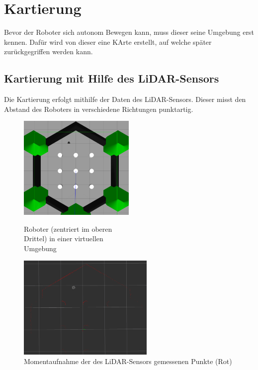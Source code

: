 \section{Kartierung}
{
	Bevor der Roboter sich autonom Bewegen kann, muss dieser seine Umgebung erst kennen. Dafür wird von dieser eine KArte erstellt, auf welche später zurückgegriffen werden kann.
	\subsection{Kartierung mit Hilfe des LiDAR-Sensors}
	{
		Die Kartierung erfolgt mithilfe der Daten des LiDAR-Sensors. Dieser misst den Abstand des Roboters in verschiedene Richtungen punktartig. \newline  
		\begin{figure}[H]
			\begin{minipage}{0.5\textwidth}
				\centering
				\includegraphics[height=5cm]{Bilder/virtualmap_world_gazebo.png}
				\caption{Roboter (zentriert im oberen \\ Drittel) in einer virtuellen \\Umgebung} %
				\label{pic:virtworldgazebo}
			\end{minipage}
			\begin{minipage}{0.5\textwidth}
				\centering
				\includegraphics[height=5cm]{Bilder/virtualmap_world_rviz.png}
				\caption{Momentaufnahme der des LiDAR-Sensors gemessenen Punkte (Rot)}
				\label{pic:virtworldlaserrviz}	
			\end{minipage}
		\end{figure}
		
}}
